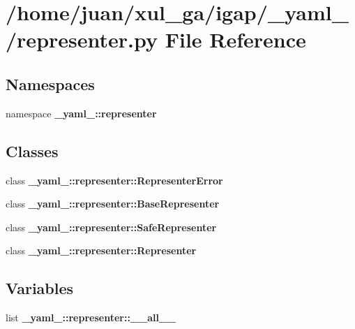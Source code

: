 \section{/home/juan/xul\_\-ga/igap/\_\-yaml\_\-/representer.py File Reference}
\label{representer_8py}
\subsection*{Namespaces}
\begin{CompactItemize}
\item 
namespace {\bf \_\-yaml\_\-::representer}
\end{CompactItemize}
\subsection*{Classes}
\begin{CompactItemize}
\item 
class {\bf \_\-yaml\_\-::representer::RepresenterError}
\item 
class {\bf \_\-yaml\_\-::representer::BaseRepresenter}
\item 
class {\bf \_\-yaml\_\-::representer::SafeRepresenter}
\item 
class {\bf \_\-yaml\_\-::representer::Representer}
\end{CompactItemize}
\subsection*{Variables}
\begin{CompactItemize}
\item 
list {\bf \_\-yaml\_\-::representer::\_\-\_\-all\_\-\_\-}
\end{CompactItemize}
